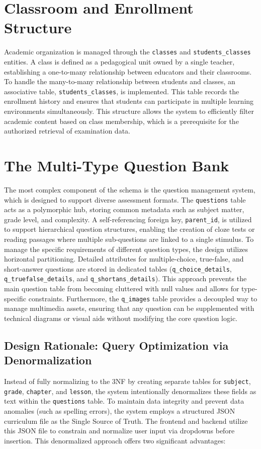 \documentclass[../report_main.tex]{subfiles}
\begin{document}
\section{Classroom and Enrollment Structure}
Academic organization is managed through the \texttt{classes} and \texttt{students_classes} entities. A class is defined as a pedagogical unit owned by a single teacher, establishing a one-to-many relationship between educators and their classrooms. To handle the many-to-many relationship between students and classes, an associative table, \texttt{students_classes}, is implemented. This table records the enrollment history and ensures that students can participate in multiple learning environments simultaneously. This structure allows the system to efficiently filter academic content based on class membership, which is a prerequisite for the authorized retrieval of examination data.
\section{The Multi-Type Question Bank}
The most complex component of the schema is the question management system, which is designed to support diverse assessment formats. The \texttt{questions} table acts as a polymorphic hub, storing common metadata such as subject matter, grade level, and complexity. A self-referencing foreign key, \texttt{parent_id}, is utilized to support hierarchical question structures, enabling the creation of cloze tests or reading passages where multiple sub-questions are linked to a single stimulus.
To manage the specific requirements of different question types, the design utilizes horizontal partitioning. Detailed attributes for multiple-choice, true-false, and short-answer questions are stored in dedicated tables (\texttt{q_choice_details}, \texttt{q_truefalse_details}, and \texttt{q_shortans_details}). This approach prevents the main question table from becoming cluttered with null values and allows for type-specific constraints. Furthermore, the \texttt{q_images} table provides a decoupled way to manage multimedia assets, ensuring that any question can be supplemented with technical diagrams or visual aids without modifying the core question logic.

\subsection{Design Rationale: Query Optimization via Denormalization}
Instead of fully normalizing to the \gls{3NF} by creating separate tables for \texttt{subject}, \texttt{grade}, \texttt{chapter}, and \texttt{lesson}, the system intentionally denormalizes these fields as text within the \texttt{questions} table. To maintain data integrity and prevent data anomalies (such as spelling errors), the system employs a structured \gls{JSON} curriculum file as the Single Source of Truth. The frontend and backend utilize this \gls{JSON} file to constrain and normalize user input via dropdowns before insertion. This denormalized approach offers two significant advantages:
\end{document}
